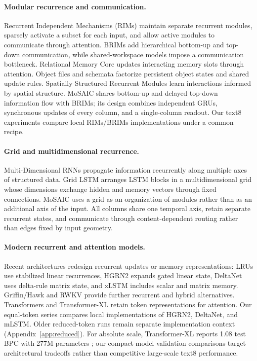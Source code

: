 \documentclass[letterpaper,twoside]{article}
\begin{document}
\paragraph{Modular recurrence and communication.}
Recurrent Independent Mechanisms (RIMs) \citep{goyal2019rims} maintain separate recurrent modules, sparsely activate a subset for each input, and allow active modules to communicate through attention. BRIMs \citep{mittal2020brims} add hierarchical bottom-up and top-down communication, while shared-workspace models \citep{goyal2021workspace} impose a communication bottleneck. Relational Memory Core \citep{santoro2018relational} updates interacting memory slots through attention. Object files and schemata \citep{goyal2021factorizing} factorize persistent object states and shared update rules. Spatially Structured Recurrent Modules \citep{rahaman2021spatial} learn interactions informed by spatial structure. MoSAIC shares bottom-up and delayed top-down information flow with BRIMs; its design combines independent GRUs, synchronous updates of every column, and a single-column readout. Our text8 experiments compare local RIMs/BRIMs implementations under a common recipe.

\paragraph{Grid and multidimensional recurrence.}
Multi-Dimensional RNNs \citep{graves2007mdrnn} propagate information recurrently along multiple axes of structured data. Grid LSTM \citep{kalchbrenner2015gridlstm} arranges LSTM blocks in a multidimensional grid whose dimensions exchange hidden and memory vectors through fixed connections. MoSAIC uses a grid as an organization of modules rather than as an additional axis of the input. All columns share one temporal axis, retain separate recurrent states, and communicate through content-dependent routing rather than edges fixed by input geometry.

\paragraph{Modern recurrent and attention models.}
Recent architectures redesign recurrent updates or memory representations: LRUs \citep{orvieto2023lru} use stabilized linear recurrences, HGRN2 \citep{qin2024hgrn2} expands gated linear state, DeltaNet \citep{yang2024deltanet} uses delta-rule matrix state, and xLSTM \citep{beck2024xlstm} includes scalar and matrix memory. Griffin/Hawk \citep{de2024griffin} and RWKV \citep{peng2023rwkv} provide further recurrent and hybrid alternatives. Transformers \citep{vaswani2017attention} and Transformer-XL \citep{dai2019transformerxl} retain token representations for attention. Our equal-token series compares local implementations of HGRN2, DeltaNet, and mLSTM. Older reduced-token runs remain separate implementation context (Appendix~\ref{app:reduced}). For absolute scale, Transformer-XL reports 1.08 test BPC with 277M parameters \citep{dai2019transformerxl}; our compact-model validation comparisons target architectural tradeoffs rather than competitive large-scale text8 performance.
\end{document}
